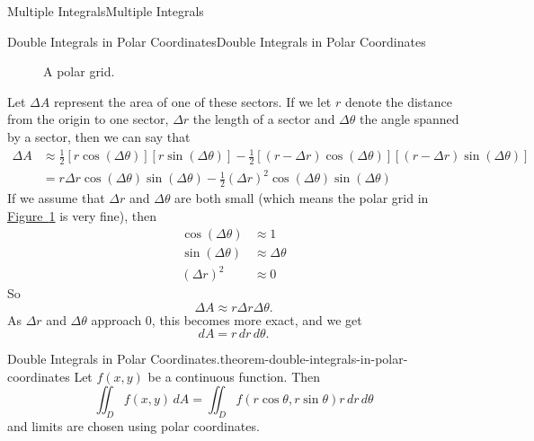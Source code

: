 \documentclass[10pt,]{book}
\numberwithin{equation}{section}
\begin{document}
\begin{chapterptx}{Multiple Integrals}{}{Multiple Integrals}{}{}
\begin{sectionptx}{Double Integrals in Polar Coordinates}{}{Double Integrals in Polar Coordinates}{}{}
\begin{figure}
{
}
\caption{A polar grid.\label{figure-polar-rectangle}}
\end{figure}
%
\par
\hypertarget{p-1269}{}%
Let \(\Delta A\) represent the area of one of these sectors. If we let \(r\) denote the distance from the origin to one sector, \(\Delta r\) the length of a sector and \(\Delta\theta\) the angle spanned by a sector, then we can say that%
\begin{align*}
\Delta A & \approx \frac{1}{2}[r\cos(\Delta\theta)][r\sin(\Delta\theta)] - \frac{1}{2}[(r-\Delta r)\cos(\Delta\theta)][(r-\Delta r)\sin(\Delta\theta)] \\
& = r\Delta r\cos(\Delta\theta)\sin(\Delta\theta) - \frac{1}{2}(\Delta r)^{2}\cos(\Delta\theta)\sin(\Delta\theta)
\end{align*}
If we assume that \(\Delta r\) and \(\Delta\theta\) are both small (which means the polar grid in \hyperref[figure-polar-rectangle]{Figure~\ref{figure-polar-rectangle}} is very fine), then%
\begin{align*}
\cos(\Delta\theta) & \approx 1 \\
\sin(\Delta\theta) & \approx \Delta\theta \\
(\Delta r)^{2} & \approx 0 
\end{align*}
So%
\begin{equation*}
\Delta A \approx r\Delta r\Delta\theta\text{.}
\end{equation*}
As \(\Delta r\) and \(\Delta\theta\) approach \(0\), this becomes more exact, and we get%
\begin{equation*}
dA = r\,dr\,d\theta\text{.}
\end{equation*}
%
\begin{theorem}{Double Integrals in Polar Coordinates.}{}{theorem-double-integrals-in-polar-coordinates}%
\hypertarget{p-1270}{}%
Let \(f(x,y)\) be a continuous function. Then%
\begin{equation*}
\iint_{D}f(x,y)\,dA = \iint_{D}f(r\cos\theta,r\sin\theta)r\,dr\,d\theta
\end{equation*}
and limits are chosen using polar coordinates.%

\end{theorem}
\end{sectionptx}
\end{chapterptx}
\end{document}
